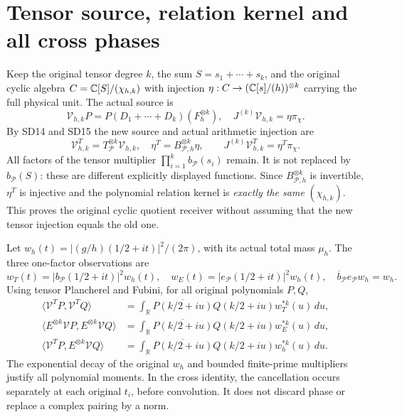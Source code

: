 \section{Tensor source, relation kernel and all cross phases}
Keep the original tensor degree $k$, the sum $S=s_1+\cdots+s_k$,
and the original cyclic algebra $C=\mathbb C[S]/(\chi_{h,k})$ with
injection $\eta:C\to(\mathbb C[s]/(h))^{\otimes k}$ carrying the full
physical unit. The actual source is
\[
 \mathcal V_{h,k}P=P(D_1+\cdots+D_k)(F_h^{\otimes k}),\quad
 J^{(k)}\mathcal V_{h,k}=\eta\pi_\chi.
                                                               \tag{SD18}
\]
By SD14 and SD15 the new source and actual arithmetic injection are
\[
 \mathcal V^T_{h,k}=T_{\mathcal P}^{\otimes k}\mathcal V_{h,k},
 \quad\eta^T=B_{\mathcal P,h}^{\otimes k}\eta,
 \qquad J^{(k)}\mathcal V^T_{h,k}=\eta^T\pi_\chi.              \tag{SD19}
\]
All factors of the tensor multiplier
$\prod_{i=1}^kb_{\mathcal P}(s_i)$ remain. It is not replaced by
$b_{\mathcal P}(S)$: these are different explicitly displayed
functions. Since $B_{\mathcal P,h}^{\otimes k}$ is invertible,
$\eta^T$ is injective and the polynomial relation kernel is
\emph{exactly the same} $(\chi_{h,k})$. This proves the original
cyclic quotient receiver without assuming that the new tensor
injection equals the old one.

Let $w_h(t)=|(g/h)(1/2+it)|^2/(2\pi)$, with its actual total mass
$\mu_h$. The three one-factor observations are
\[
 w_T(t)=|b_{\mathcal P}(1/2+it)|^2w_h(t),\quad
 w_E(t)=|e_{\mathcal P}(1/2+it)|^2w_h(t),\quad
 \overline b_{\mathcal P}e_{\mathcal P}w_h=w_h.                \tag{SD20}
\]
Using tensor Plancherel and Fubini, for all original polynomials $P,Q$,
\begin{align*}
\langle\mathcal V^T P,\mathcal V^T Q\rangle
 &=\int_\mathbb R\overline{P(k/2+iu)}Q(k/2+iu)
                      w_T^{*k}(u)\,du,\\
\langle E^{\otimes k}\mathcal V P,E^{\otimes k}\mathcal V Q\rangle
 &=\int_\mathbb R\overline{P(k/2+iu)}Q(k/2+iu)
                      w_E^{*k}(u)\,du,\\
\boxed{\langle\mathcal V^T P,E^{\otimes k}\mathcal V Q\rangle}
 &=\boxed{\int_\mathbb R\overline{P(k/2+iu)}Q(k/2+iu)
                       w_h^{*k}(u)\,du.}                    \tag{SD21}
\end{align*}
The exponential decay of the original $w_h$ and bounded finite-prime
multipliers justify all polynomial moments. In the cross identity,
the cancellation occurs separately at each original $t_i$, before
convolution. It does not discard phase or replace a complex pairing
by a norm.

